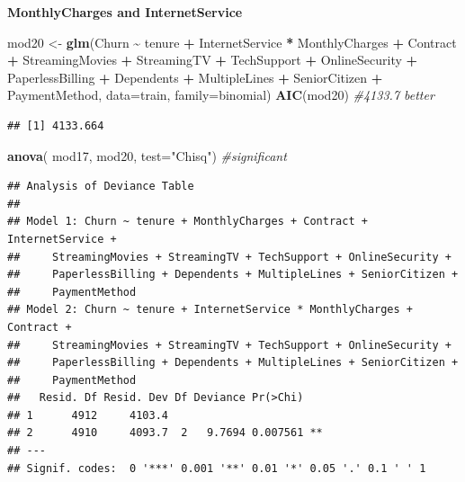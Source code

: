 \documentclass[
  twoside]{article}
\newenvironment{Shaded}{\begin{snugshade}}{\end{snugshade}}
\newcommand{\AttributeTok}[1]{\textcolor[rgb]{0.13,0.29,0.53}{#1}}
\newcommand{\CommentTok}[1]{\textcolor[rgb]{0.56,0.35,0.01}{\textit{#1}}}
\newcommand{\FunctionTok}[1]{\textcolor[rgb]{0.13,0.29,0.53}{\textbf{#1}}}
\newcommand{\NormalTok}[1]{#1}
\newcommand{\OtherTok}[1]{\textcolor[rgb]{0.56,0.35,0.01}{#1}}
\newcommand{\SpecialCharTok}[1]{\textcolor[rgb]{0.81,0.36,0.00}{\textbf{#1}}}
\newcommand{\StringTok}[1]{\textcolor[rgb]{0.31,0.60,0.02}{#1}}
\begin{document}
\textbf{MonthlyCharges and InternetService}

\begin{Shaded}
\begin{Highlighting}[]
\NormalTok{mod20 }\OtherTok{\textless{}{-}} \FunctionTok{glm}\NormalTok{(Churn }\SpecialCharTok{\textasciitilde{}}\NormalTok{ tenure }\SpecialCharTok{+}\NormalTok{ InternetService }\SpecialCharTok{*}\NormalTok{ MonthlyCharges }\SpecialCharTok{+}\NormalTok{ Contract }\SpecialCharTok{+} 
\NormalTok{               StreamingMovies }\SpecialCharTok{+}\NormalTok{ StreamingTV }\SpecialCharTok{+}\NormalTok{ TechSupport }\SpecialCharTok{+}\NormalTok{ OnlineSecurity }\SpecialCharTok{+} 
\NormalTok{               PaperlessBilling }\SpecialCharTok{+}\NormalTok{ Dependents }\SpecialCharTok{+}\NormalTok{ MultipleLines }\SpecialCharTok{+}\NormalTok{ SeniorCitizen }\SpecialCharTok{+} 
\NormalTok{               PaymentMethod, }\AttributeTok{data=}\NormalTok{train, }\AttributeTok{family=}\NormalTok{binomial)}
\FunctionTok{AIC}\NormalTok{(mod20) }\CommentTok{\#4133.7 better}
\end{Highlighting}
\end{Shaded}

\begin{verbatim}
## [1] 4133.664
\end{verbatim}

\begin{Shaded}
\begin{Highlighting}[]
\FunctionTok{anova}\NormalTok{( mod17, mod20,  }\AttributeTok{test=}\StringTok{"Chisq"}\NormalTok{) }\CommentTok{\#significant}
\end{Highlighting}
\end{Shaded}

\begin{verbatim}
## Analysis of Deviance Table
## 
## Model 1: Churn ~ tenure + MonthlyCharges + Contract + InternetService + 
##     StreamingMovies + StreamingTV + TechSupport + OnlineSecurity + 
##     PaperlessBilling + Dependents + MultipleLines + SeniorCitizen + 
##     PaymentMethod
## Model 2: Churn ~ tenure + InternetService * MonthlyCharges + Contract + 
##     StreamingMovies + StreamingTV + TechSupport + OnlineSecurity + 
##     PaperlessBilling + Dependents + MultipleLines + SeniorCitizen + 
##     PaymentMethod
##   Resid. Df Resid. Dev Df Deviance Pr(>Chi)   
## 1      4912     4103.4                        
## 2      4910     4093.7  2   9.7694 0.007561 **
## ---
## Signif. codes:  0 '***' 0.001 '**' 0.01 '*' 0.05 '.' 0.1 ' ' 1
\end{verbatim}
\end{document}
